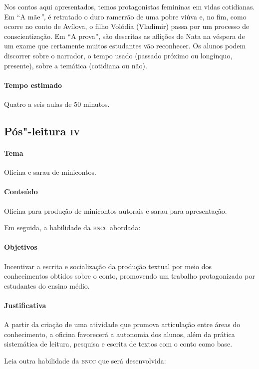 \documentclass[11pt]{extarticle}
\begin{document}
Nos contos aqui apresentados, temos protagonistas femininas em vidas
cotidianas. Em ``A mãe\emph{'',} é retratado o duro ramerrão de uma
pobre viúva e, no fim, como ocorre no conto de Avílova, o filho Volódia
(Vladímir) passa por um processo de conscientização. Em ``A prova'', são
descritas as aflições de Nata na véspera de um exame que certamente
muitos estudantes vão reconhecer. Os alunos podem discorrer sobre o
narrador, o tempo usado (passado próximo ou longínquo, presente), sobre
a temática (cotidiana ou não).

\paragraph{Tempo estimado} Quatro a seis aulas de 50 minutos.

\subsection{Pós"-leitura \textsc{iv}}

\paragraph{Tema} Oficina e sarau de minicontos.

\paragraph{Conteúdo}
Oficina para produção de minicontos autorais e sarau para apresentação.

Em seguida, a habilidade da \textsc{bncc} abordada:

\paragraph{Objetivos}
Incentivar a escrita e socialização da produção textual por meio dos
conhecimentos obtidos sobre o conto, promovendo um trabalho
protagonizado por estudantes do ensino médio.

\paragraph{Justificativa}
A partir da criação de uma atividade que promova articulação entre áreas
do conhecimento, a oficina favorecerá a autonomia dos alunos, além da
prática sistemática de leitura, pesquisa e escrita de textos com o conto
como base.

Leia outra habilidade da \textsc{bncc} que será desenvolvida:
\end{document}
